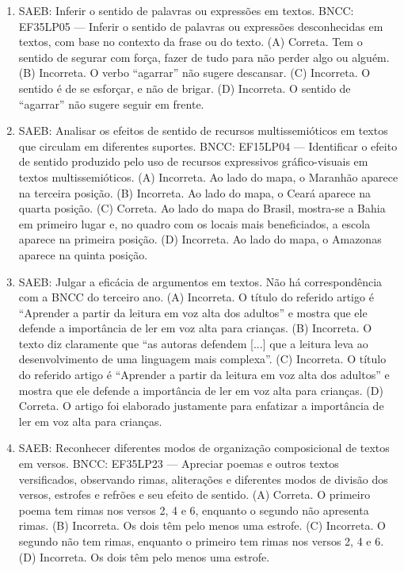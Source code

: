 \begin{enumerate}
\item
SAEB: Inferir o sentido de palavras ou expressões em textos. 
BNCC: EF35LP05 --- Inferir o sentido de palavras ou expressões desconhecidas em textos, com base no contexto da frase ou do texto. 
(A) Correta. Tem o sentido de segurar com força, fazer de tudo para não perder algo ou alguém.
(B) Incorreta. O verbo ``agarrar'' não sugere descansar. 
(C) Incorreta. O sentido é de se esforçar, e não de brigar. 
(D) Incorreta. O sentido de ``agarrar'' não sugere seguir em frente.

\item
SAEB: Analisar os efeitos de sentido de recursos multissemióticos em textos que circulam em diferentes suportes. 
BNCC: EF15LP04 --- Identificar o efeito de sentido produzido pelo uso de recursos expressivos gráfico-visuais em textos multissemióticos. 
(A) Incorreta. Ao lado do mapa, o Maranhão aparece na terceira posição. 
(B) Incorreta. Ao lado do mapa, o Ceará aparece na quarta posição. 
(C) Correta. Ao lado do mapa do Brasil, mostra-se a Bahia em primeiro lugar e, no quadro com os locais mais beneficiados, a escola aparece na primeira posição. 
(D) Incorreta. Ao lado do mapa, o Amazonas aparece na quinta posição.

\item
SAEB: Julgar a eficácia de argumentos em textos. Não há correspondência com a BNCC do terceiro ano. 
(A) Incorreta. O título do referido artigo é ``Aprender a partir da leitura em voz alta dos adultos'' e mostra que ele defende a importância de ler em voz alta para crianças. 
(B) Incorreta. O texto diz claramente que ``as autoras defendem {[}...{]} que a leitura leva ao desenvolvimento de uma linguagem mais complexa''. 
(C) Incorreta. O título do referido artigo é ``Aprender a partir da leitura em voz alta dos adultos'' e mostra que ele defende a importância de ler em voz alta para crianças. 
(D) Correta. O artigo foi elaborado justamente para enfatizar a importância de ler em voz alta para crianças.

\item
SAEB: Reconhecer diferentes modos de organização composicional de textos em versos. BNCC: EF35LP23 --- Apreciar poemas e outros textos versificados, observando rimas, aliterações e diferentes modos de divisão dos versos, estrofes e refrões e seu efeito de sentido. 
(A) Correta. O primeiro poema tem rimas nos versos 2, 4 e 6, enquanto o segundo não apresenta rimas. 
(B) Incorreta. Os dois têm pelo menos uma estrofe. 
(C) Incorreta. O segundo não tem rimas, enquanto o primeiro tem rimas nos versos 2, 4 e 6. 
(D) Incorreta. Os dois têm pelo menos uma estrofe.


\end{enumerate}

